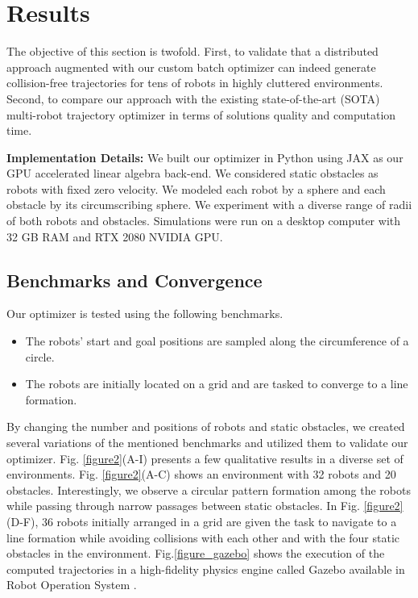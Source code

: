  


\section{Results}\label{sec: GPU_mat_Results}
The objective of this section is twofold. First, to validate that a distributed approach augmented with our custom batch optimizer can indeed generate collision-free trajectories for tens of robots in highly cluttered environments. Second, to compare our approach with the existing state-of-the-art (SOTA) multi-robot trajectory optimizer in terms of solutions quality and computation time.

\noindent \textbf{Implementation Details:} We built our optimizer in Python using JAX \citep{bradbury2020jax} as our GPU accelerated linear algebra back-end. We considered static obstacles as robots with fixed zero velocity. We modeled each robot by a sphere and each obstacle by its circumscribing sphere. We experiment with a diverse range of radii of both robots and obstacles. Simulations were run on a desktop computer with 32 GB RAM and RTX 2080 NVIDIA GPU.

\subsection{Benchmarks and Convergence}
\noindent Our optimizer is tested using the following benchmarks.
\begin{itemize}
    \item The robots' start and goal positions are sampled along the circumference of a circle.
    
    \item The robots are initially located on a grid and are tasked to converge to a line formation. 
\end{itemize}

By changing the number and positions of robots and static obstacles, we created several variations of the mentioned benchmarks and utilized them to validate our optimizer. Fig. \ref{figure2}(A-I) presents a few qualitative results in a diverse set of environments. Fig. \ref{figure2}(A-C) shows an environment with 32 robots and 20 obstacles. Interestingly, we observe a circular pattern formation among the robots while passing through narrow passages between static obstacles. In Fig. \ref{figure2}(D-F), 36 robots initially arranged in a grid are given the task to navigate to a line formation while avoiding collisions with each other and with the four static obstacles in the environment. Fig.\ref{figure_gazebo} shows the execution of the computed trajectories in a high-fidelity physics engine called Gazebo available in Robot Operation System \citep{ros_gazebo}. 


